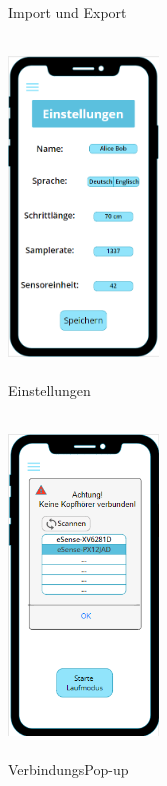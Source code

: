 \documentclass[a4paper,12pt]{article}
\begin{document}
\begin{figure}[ht!]
\begin{minipage}{0.4\textwidth}
		\caption{Import und Export}
	\end{minipage}
	\hfill
	\begin{minipage}{0.4\textwidth}
		\includegraphics[width=4cm,height=9cm]{./Benutzeroberflaeche/Settings.png}
		\caption{Einstellungen}
	\end{minipage}
\end{figure}

\clearpage
\begin{figure}[ht!]
	\centering
	\begin{minipage}{0.4\textwidth}
		\includegraphics[width=4cm,height=9cm]{./Benutzeroberflaeche/VerbindungsPopUp.png}
		\caption{VerbindungsPop-up}
		\vspace{30px}
	\end{minipage}
\end{figure}
\end{document}
